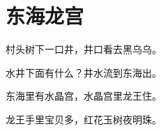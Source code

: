 \documentclass[12pt,UTF-8,openany]{ctexbook}
\begin{document}
\clearpage

\begin{center}
    
    
\end{center}


\hanzibox{}\hanzibox{}\hanzibox{}\hanzibox{}\hspace{1em}\hanzibox{}\hanzibox{}\hanzibox{}\hanzibox{}

\hanzibox{}\hanzibox{}\hanzibox{}\hanzibox{}\hspace{1em}\hanzibox{}\hanzibox{}\hanzibox{}\hanzibox{}

\hanzibox{}\hanzibox{}\hanzibox{}\hanzibox{}\hspace{1em}\hanzibox{}\hanzibox{}\hanzibox{}\hanzibox{}

\hanzibox{}\hanzibox{}\hanzibox{}\hanzibox{}\hspace{1em}\hanzibox{}\hanzibox{}\hanzibox{}\hanzibox{}






\chapter{东海龙宫}

\begin{large}
    
    村头树下一口井，井口看去黑乌乌。
    
    水井下面有什么？井水流到东海出。
    
    东海里有水晶宫，水晶宫里龙王住。
    
    龙王手里宝贝多，红花玉树夜明珠。
    
\end{large}


\clearpage

\begin{center}
    
    
    
\end{center}
\end{document}
